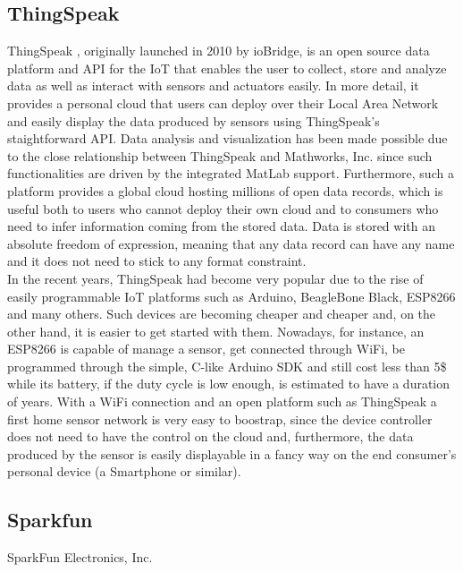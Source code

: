 \documentclass[a4paper,10pt]{article}
\begin{document}
\subsection*{ThingSpeak}
ThingSpeak \cite{thingspeak}, originally launched in 2010 by ioBridge, is an open source data platform and API for the IoT that enables the user to collect, store and analyze data as well as interact with sensors and actuators easily.
In more detail, it provides a personal cloud that users can deploy over their Local Area Network and easily display the data produced by sensors using ThingSpeak's staightforward API.
Data analysis and visualization has been made possible due to the close relationship between ThingSpeak and Mathworks, Inc. since such functionalities are driven by the integrated MatLab support. 
Furthermore, such a platform provides a global cloud hosting millions of open data records, which is useful both to users who cannot deploy their own cloud and to consumers who need to infer information coming from the stored data.
Data is stored with an absolute freedom of expression, meaning that any data record can have any name and it does not need to stick to any format constraint.
\\

In the recent years, ThingSpeak had become very popular due to the rise of easily programmable IoT platforms such as Arduino, BeagleBone Black, ESP8266 and many others.
Such devices are becoming cheaper and cheaper and, on the other hand, it is easier to get started with them.
Nowadays, for instance, an ESP8266 is capable of manage a sensor, get connected through WiFi, be programmed through the simple, C-like Arduino SDK and still cost less than 5\$ while its battery, if the duty cycle is low enough, is estimated to have a duration of years.
With a WiFi connection and an open platform such as ThingSpeak a first home sensor network is very easy to boostrap, since the device controller does not need to have the control on the cloud and, furthermore, the data produced by the sensor is easily displayable in a fancy way on the end consumer's personal device (a Smartphone or similar).

\subsection*{Sparkfun}
SparkFun Electronics, Inc. \cite{sparkfun}





\end{document}
